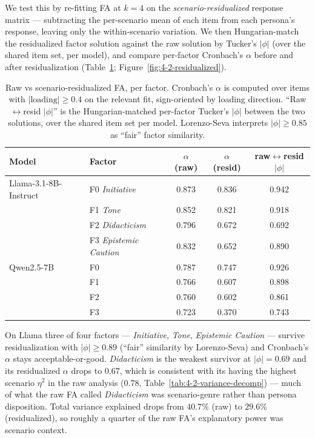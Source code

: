 We test this by re-fitting FA at $k=4$ on the \textit{scenario-residualized} response matrix --- subtracting the per-scenario mean of each item from each persona's response, leaving only the within-scenario variation.
We then Hungarian-match the residualized factor solution against the raw solution by Tucker's $|\phi|$ (over the shared item set, per model), and compare per-factor Cronbach's $\alpha$ before and after residualization (Table~\ref{tab:4-2-residualized}; Figure~\ref{fig:4-2-residualized}).

\begin{table}[htbp]
\centering
\caption{Raw vs scenario-residualized FA, per factor. Cronbach's $\alpha$ is computed over items with $|\text{loading}|\geq 0.4$ on the relevant fit, sign-oriented by loading direction. ``Raw$\leftrightarrow$resid $|\phi|$'' is the Hungarian-matched per-factor Tucker's $|\phi|$ between the two solutions, over the shared item set per model. Lorenzo-Seva interprets $|\phi|\geq 0.85$ as ``fair'' factor similarity.}
\label{tab:4-2-residualized}
\begin{tabular}{l l c c c}
\toprule
Model & Factor & $\alpha$ (raw) & $\alpha$ (resid) & raw$\leftrightarrow$resid $|\phi|$ \\
\midrule
Llama-3.1-8B-Instruct  & F0 \textit{Initiative}        & 0.873 & 0.836 & 0.942 \\
              & F1 \textit{Tone}              & 0.852 & 0.821 & 0.918 \\
              & F2 \textit{Didacticism}       & 0.796 & 0.672 & 0.692 \\
              & F3 \textit{Epistemic Caution} & 0.832 & 0.652 & 0.890 \\
\midrule
Qwen2.5-7B    & F0 & 0.787 & 0.747 & 0.926 \\
              & F1 & 0.766 & 0.607 & 0.898 \\
              & F2 & 0.760 & 0.602 & 0.861 \\
              & F3 & 0.723 & 0.370 & 0.743 \\
\bottomrule
\end{tabular}
\end{table}

On Llama three of four factors --- \textit{Initiative}, \textit{Tone}, \textit{Epistemic Caution} --- survive residualization with $|\phi| \geq 0.89$ (``fair'' similarity by Lorenzo-Seva) and Cronbach's $\alpha$ stays acceptable-or-good.
\textit{Didacticism} is the weakest survivor at $|\phi| = 0.69$ and its residualized $\alpha$ drops to $0.67$, which is consistent with its having the highest scenario $\eta^2$ in the raw analysis (0.78, Table~\ref{tab:4-2-variance-decomp}) --- much of what the raw FA called \textit{Didacticism} was scenario-genre rather than persona disposition.
Total variance explained drops from $40.7\%$ (raw) to $29.6\%$ (residualized), so roughly a quarter of the raw FA's explanatory power was scenario context.

